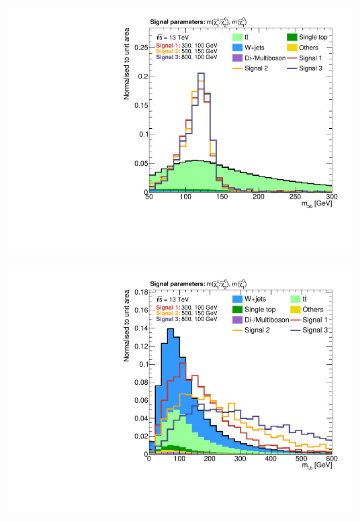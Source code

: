\begin{figure}
\begin{subfigure}[b]{0.49\linewidth}
		\caption{\label{fig:norm_met}}
	\end{subfigure}\hfill
	\begin{subfigure}[b]{0.49\linewidth}
		\centering\includegraphics[width=\textwidth]{presel/mbb}
		\caption{\label{fig:norm_mbb}}
	\end{subfigure}
	\begin{subfigure}[b]{0.49\linewidth}
		\centering\includegraphics[width=\textwidth]{presel/mlb1}
		\caption{\label{fig:norm_mlb1}}
	\end{subfigure}\hfill
	\begin{subfigure}[b]{0.49\linewidth}

\end{subfigure}
\end{figure}
